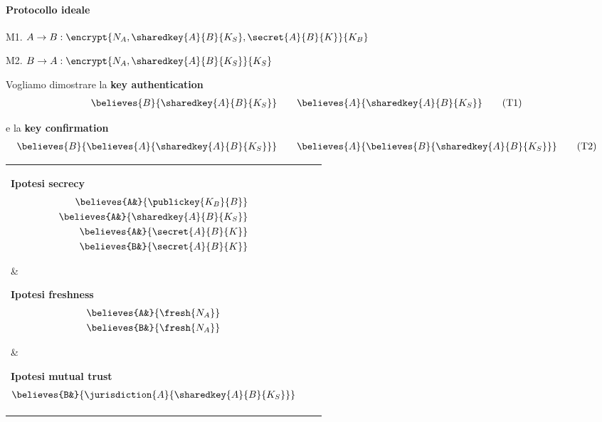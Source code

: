 \documentclass[a4paper]{article}
\begin{document}
\paragraph{Protocollo ideale}
\begin{list}{}{}
\item M1. $ A \rightarrow B: \encrypt{N_A, \sharedkey{A}{B}{K_S}, \secret{A}{B}{K}}{K_B} $
\item M2. $ B \rightarrow A: \encrypt{N_A, \sharedkey{A}{B}{K_S} }{K_S} $
\end{list}

Vogliamo dimostrare la {\bf key authentication}
\begin{align}
  \believes{B}{ \sharedkey{A}{B}{K_S} }& \qquad
  \believes{A}{ \sharedkey{A}{B}{K_S} } \tag{T1}
\end{align}

e la {\bf key confirmation}
\begin{align}
  \believes{B}{ \believes{A}{ \sharedkey{A}{B}{K_S} } }& \qquad
  \believes{A}{ \believes{B}{ \sharedkey{A}{B}{K_S} } } \tag{T2}
\end{align}

\begin{tabular}{ p{4cm} p{4cm} p{4cm} }

  \parbox[t][][t]{4cm} {
    {\bf Ipotesi secrecy}
    \begin{align}
      \believes{A&}{ \publickey{K_B}{B} }\\
      \believes{A&}{ \sharedkey{A}{B}{K_S} }\\
      \believes{A&}{ \secret{A}{B}{K} }\\
      \believes{B&}{ \secret{A}{B}{K} }
    \end{align}
  }&

  \parbox[t][][t]{4cm} {
    {\bf Ipotesi freshness}
    \begin{align}
      \believes{A&}{ \fresh{N_A} }\\
      \believes{B&}{ \fresh{N_A} }
    \end{align}
  }&

  \parbox[t][][t]{4cm} {
    {\bf Ipotesi mutual trust}
    \begin{align}
      \believes{B&}{ \jurisdiction{A}{ \sharedkey{A}{B}{K_S} } }
    \end{align}
  }
\end{tabular} \\
\end{document}
